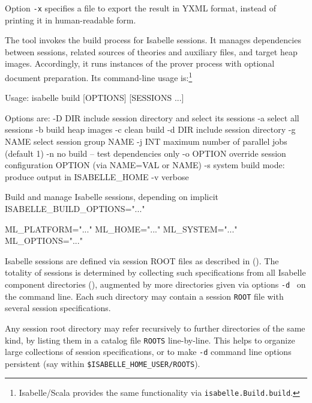 \begin{isabellebody}
\begin{isamarkuptext}
  Option \verb|-x| specifies a file to export the result in
  YXML format, instead of printing it in human-readable form.%
\end{isamarkuptext}%
\isamarkuptrue%
%
\isamarkuptrue%
%
\begin{isamarkuptext}%
The \hypertarget{tool.build}{\hyperlink{tool.build}{\mbox{}}} tool invokes the build process for
  Isabelle sessions.  It manages dependencies between sessions,
  related sources of theories and auxiliary files, and target heap
  images.  Accordingly, it runs instances of the prover process with
  optional document preparation.  Its command-line usage
  is:\footnote{Isabelle/Scala provides the same functionality via
  \texttt{isabelle.Build.build}.}
\begin{ttbox}
Usage: isabelle build [OPTIONS] [SESSIONS ...]

  Options are:
    -D DIR       include session directory and select its sessions
    -a           select all sessions
    -b           build heap images
    -c           clean build
    -d DIR       include session directory
    -g NAME      select session group NAME
    -j INT       maximum number of parallel jobs (default 1)
    -n           no build -- test dependencies only
    -o OPTION    override session configuration OPTION
                 (via NAME=VAL or NAME)
    -s           system build mode: produce output in ISABELLE_HOME
    -v           verbose

  Build and manage Isabelle sessions, depending on implicit
  ISABELLE_BUILD_OPTIONS="..."

  ML_PLATFORM="..."
  ML_HOME="..."
  ML_SYSTEM="..."
  ML_OPTIONS="..."
\end{ttbox}

  \medskip Isabelle sessions are defined via session ROOT files as
  described in ().  The totality of sessions
  is determined by collecting such specifications from all Isabelle
  component directories (), augmented by more
  directories given via options \verb|-d|~ on the
  command line.  Each such directory may contain a session
  \texttt{ROOT} file with several session specifications.

  Any session root directory may refer recursively to further
  directories of the same kind, by listing them in a catalog file
  \verb|ROOTS| line-by-line.  This helps to organize large
  collections of session specifications, or to make \verb|-d|
  command line options persistent (say within \verb|$ISABELLE_HOME_USER/ROOTS|).


\end{isamarkuptext}
\end{isabellebody}
